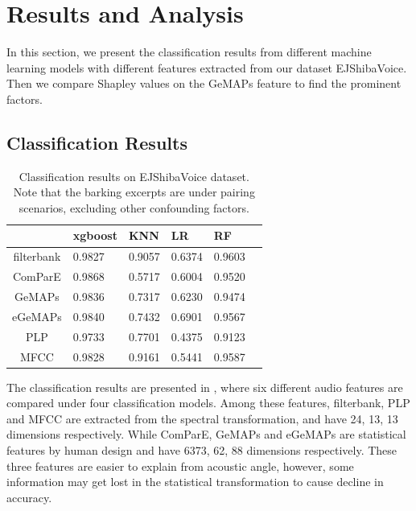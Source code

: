 \section{Results and Analysis}
\label{sec:results}

In this section, we present the classification results from different machine learning models with different features extracted from our dataset EJShibaVoice. Then we compare Shapley values on the GeMAPs feature to find the prominent factors.

\subsection{Classification Results}
\label{sec:main}
\begin{table}[H]
	\scriptsize
	\centering
	\begin{tabular}{l|l|lllll}
		\toprule
		\multicolumn{2}{c|}{}            & xgboost & KNN  & LR   & RF  \\
		\midrule
		\multicolumn{2}{c|}{filterbank}          & 0.9827        & 0.9057         & 0.6374    & 0.9603    \\
		\multicolumn{2}{c|}{ComParE} & {0.9868} & {0.5717} & {0.6004} & {0.9520}\\
		\multicolumn{2}{c|}{GeMAPs} & 0.9836 & 0.7317 & 0.6230 & 0.9474 \\
		\multicolumn{2}{c|}{eGeMAPs} & 0.9840 & 0.7432 & 0.6901 & 0.9567\\
		\multicolumn{2}{c|}{PLP} & 0.9733 & 0.7701 & 0.4375 & 0.9123\\
		\multicolumn{2}{c|}{MFCC} & 0.9828 & 0.9161 & 0.5441 & 0.9587\\
		\bottomrule
	\end{tabular}
	\caption{Classification results on EJShibaVoice dataset. Note that the barking excerpts are under pairing scenarios, excluding other confounding factors.} %
	\label{table:mainresult}
\end{table}

The classification results are presented in , where six different audio features are compared under four classification models. Among these features, filterbank, PLP and MFCC are extracted from the spectral transformation, and have 24, 13, 13 dimensions respectively. While ComParE, GeMAPs and eGeMAPs are statistical features by human design and have 6373, 62, 88 dimensions respectively. These three features are easier to explain from acoustic angle, however, some information may get lost in the statistical transformation to cause decline in accuracy.


